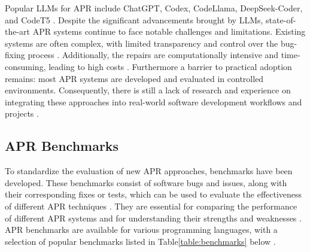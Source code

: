 Popular \acp{LLM} for APR include ChatGPT, Codex, CodeLlama, DeepSeek-Coder, and CodeT5 \cite{houLargeLanguageModels2024, yinThinkRepairSelfDirectedAutomated2024, anandComprehensiveSurveyAIDriven2024}. Despite the significant advancements brought by \acp{LLM}, state-of-the-art APR systems continue to face notable challenges and limitations. Existing systems are often complex, with limited transparency and control over the bug-fixing process \cite{xiaAgentlessDemystifyingLLMbased2024, puvvadiCodingAgentsComprehensive2025, houLargeLanguageModels2024}. Additionally, the repairs are computationally intensive and time-consuming, leading to high costs \cite{sobaniaAnalysisAutomaticBug2023, puvvadiCodingAgentsComprehensive2025}.
Furthermore a barrier to practical adoption remains: most APR systems are developed and evaluated in controlled environments. Consequently, there is still a lack of research and experience on integrating these approaches into real-world software development workflows and projects \cite{meemExploringExperiencesAutomated2024, puvvadiCodingAgentsComprehensive2025}.


\subsection{APR Benchmarks}

To standardize the evaluation of new APR approaches, benchmarks have been developed. These benchmarks consist of software bugs and issues, along with their corresponding fixes or tests, which can be used to evaluate the effectiveness of different APR techniques \cite{anandComprehensiveSurveyAIDriven2024}. They are essential for comparing the performance of different APR systems and for understanding their strengths and weaknesses \cite{puvvadiCodingAgentsComprehensive2025}. APR benchmarks are available for various programming languages, with a selection of popular benchmarks listed in Table\ref{table:benchmarks} below \cite{wangSoftwareDevelopmentLife2025}.

